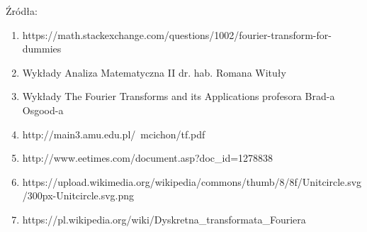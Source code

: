 \documentclass{article}
\begin{document}
Źródła:
\begin{enumerate}


\item https://math.stackexchange.com/questions/1002/fourier-transform-for-dummies

\item Wykłady Analiza Matematyczna II dr. hab. Romana Wituły

\item Wykłady The Fourier Transforms and its Applications profesora Brad-a Osgood-a

\item http://main3.amu.edu.pl/~mcichon/tf.pdf

\item http://www.eetimes.com/document.asp?doc_id=1278838

\item https://upload.wikimedia.org/wikipedia/commons/thumb/8/8f/Unitcircle.svg/300px-Unitcircle.svg.png

\item https://pl.wikipedia.org/wiki/Dyskretna_transformata_Fouriera

\end{enumerate}
\end{document}
